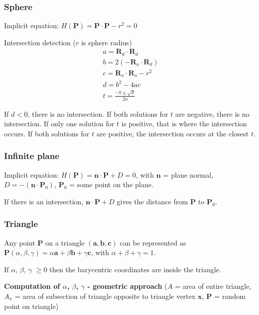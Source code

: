 \documentclass[12pt]{article}
\begin{document}
\subsubsection{Sphere}

Implicit equation: $H(\bm P) = \bm P \cdot \bm P - r^2 = 0$

Intersection detection ($r$ is sphere radius)
\begin{gather*}
    a = \bm R_d \cdot \bm R_d\\
    b = 2(-\bm R_o \cdot \bm R_d)\\
    c = \bm R_o \cdot \bm R_o - r^2\\
    d = b^2 - 4ac\\
    t = \frac{-b \pm \sqrt{d}}{2a}
\end{gather*}

If $d < 0$, there is no intersection. If both solutions for $t$
are negative, there is no intersection.
If only one solution for $t$ is positive, that is where the
intersection occurs. If both solutions for $t$ are positive,
the intersection occurs at the closest $t$.

\subsubsection{Infinite plane}

Implicit equation: $H(\bm P) = \bm n \cdot \bm P + D = 0$, with $\bm n$
= plane normal, $D = -(\bm n \cdot \bm P_0)$, $\bm P_0$ = some point on
the plane.

If there is an intersection, $\bm n \cdot \bm P + D$ gives the distance from
$\bm P$ to $\bm P_0$.

\subsubsection{Triangle}

Any point $\bm P$ on a triangle $(\bm a,\bm b,\bm c)$ can be represented as $\bm P(
\alpha,\beta,\gamma) = \alpha \bm a + \beta \bm b + \gamma \bm
c$, with $\alpha + \beta + \gamma = 1$.

If $\alpha$, $\beta$, $\gamma$ $\ge 0$ then the barycentric coordinates are inside
the triangle.

\textbf{Computation of $\alpha$, $\beta$, $\gamma$ - geometric approach} ($A$ = area
of entire triangle, $A_x$ = area of subsection of triangle opposite to
triangle vertex $\bm x$, $\bm P$ = random point on triangle)

\end{document}
